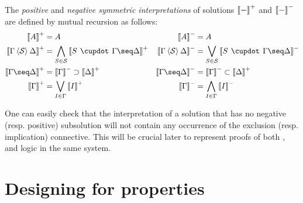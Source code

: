 \begin{definition}
  The \emph{positive} and \emph{negative symmetric interpretations} of solutions
  $\left\llbracket - \right\rrbracket^+$ and $\left\llbracket - \right\rrbracket^-$ are defined by mutual recursion as
  follows:
  \begin{align*}
    \psint{A} &= A &
    \nsint{A} &= A \\
    \psint{\Gamma \piq{\cS} \Delta} &=
      \bigwedge_{S \in \cS} \psint{S \mix \Gamma \seq \Delta} &
    \nsint{\Gamma \piq{\cS} \Delta} &=
      \bigvee_{S \in \cS} \nsint{S \mix \Gamma \seq \Delta} \\
    \psint{\Gamma \seq \Delta} &=
      \nsint{\Gamma} \limp \psint{\Delta} &
    \nsint{\Gamma \seq \Delta} &=
      \nsint{\Gamma} \lsub \psint{\Delta} \\
    \psint{\Gamma} &= \bigvee_{I \in \Gamma}{\psint{I}} &
    \nsint{\Gamma} &= \bigwedge_{I \in \Gamma}{\nsint{I}}
  \end{align*}
\end{definition}

One can easily check that the interpretation of a solution that has no negative
(resp. positive) subsolution will not contain any occurrence of the exclusion
(resp. implication) connective. This will be crucial later to represent proofs
of both ,  and  logic in the
same system.

\section{Designing for properties}

